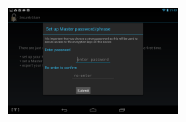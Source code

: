 \begin{figure}[h!]
    \centering
    \includegraphics[width=0.4\textwidth]{Setup}                                                                                                                                                                                                                                                                                                                                                                                                                                                                                                                                                                                                                                                                                                                                                                                                                                                                                                                                                                                                                                                                                                                                                                                                                                                                                                                                                                                                                                                                                                                                                                                                                                                                                                                                                                                                                                                                                                                                                                                                                                                                                                                                                                                                                                                                                                                                                                                                                                                                                                                                                                                                                                                                                                                                                                                                                                                                                                                                                                          

\end{figure}
